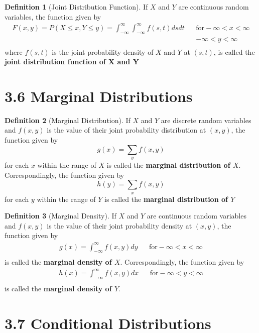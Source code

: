 \documentclass[
10pt,reqno
]{amsart}
\theoremstyle{definition}
\newtheorem{definition}{Definition}[section]
\begin{document}
\begin{definition}[Joint Distribution Function]
If \(X\) and \(Y\) are continuous random variables, the function given by 
\begin{align*}
F(x,y)=P(X \leq x, Y \leq y)= \int^\infty_{-\infty} \int^\infty_{-\infty} f(s,t) ds dt && \text{for} -\infty < x < \infty\\
&&-\infty < y < \infty\\
\end{align*}
where \(f(s,t)\) is the joint probability density of \(X\) and \(Y\) at \((s,t)\), is called the \textbf{joint distribution function of X and Y}
\end{definition}

\newpage

\section*{3.6 Marginal Distributions}

\begin{definition}[Marginal Distribution]
If \(X\) and \(Y\) are discrete random variables and \(f(x,y)\) is the value of their joint probability distribution at \((x,y)\), the function given by
\[
g(x)=\underset{y}\sum f(x,y)
\]
for each \(x\) within the range of \(X\) is called the \textbf{marginal distribution of \(X\)}. Correspondingly, the function given by
\[
h(y)=\underset{x}\sum f(x,y)
\]
for each \(y\) within the range of \(Y\) is called the \textbf{marginal distribution of \(Y\)}
\end{definition}

\begin{definition}[Marginal Density]
If \(X\) and \(Y\) are continuous random variables and \(f(x,y)\) is the value of their joint probability density at \((x,y)\), the function given by
\begin{align*}
g(x)= \int_{-\infty}^{\infty} f(x,y)dy && \text{for} -\infty < x < \infty\\
\end{align*}
is called the \textbf{marginal density of \(X\)}. Correspondingly, the function given by 
\begin{align*}
h(x)= \int_{-\infty}^{\infty} f(x,y)dx && \text{for} -\infty < y < \infty\\
\end{align*}
is called the \textbf{marginal density of \(Y\)}.
\end{definition}

\section*{3.7 Conditional Distributions}
\end{document}
